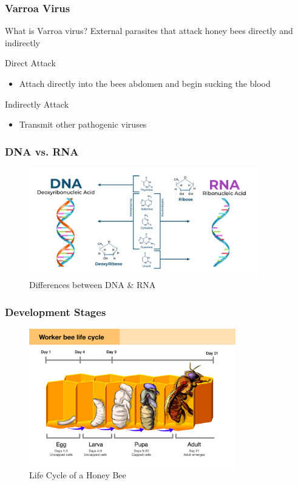 \documentclass{beamer}
\begin{document}
\begin{frame}
  \frametitle{Varroa Virus}
What is Varroa virus?
\linebreak
External parasites that attack honey bees directly and indirectly

  Direct Attack
  \begin{itemize}
  \item Attach directly into the bees abdomen and begin sucking the blood
  \end{itemize}

  Indirectly Attack
  \begin{itemize}
  \item Transmit other pathogenic viruses
  \end{itemize}
\end{frame}

\begin{frame}
  \frametitle{DNA vs. RNA}

  \begin{figure}
  \centering
      \includegraphics[width=10cm]{DNA-vs-RNA.png}
      \caption{Differences between DNA \& RNA}
      \label{DNA&RNA}
  \centering 
  \end{figure}
\end{frame}

\begin{frame}
  \frametitle{Development Stages}

  \begin{figure}
  \centering
      \includegraphics[width=9cm]{LifeCycle_Page_1.jpg}
      \caption{Life Cycle of a Honey Bee}
      \label{Life Cycle}
  \centering
  \end{figure}
\end{frame}
\end{document}
